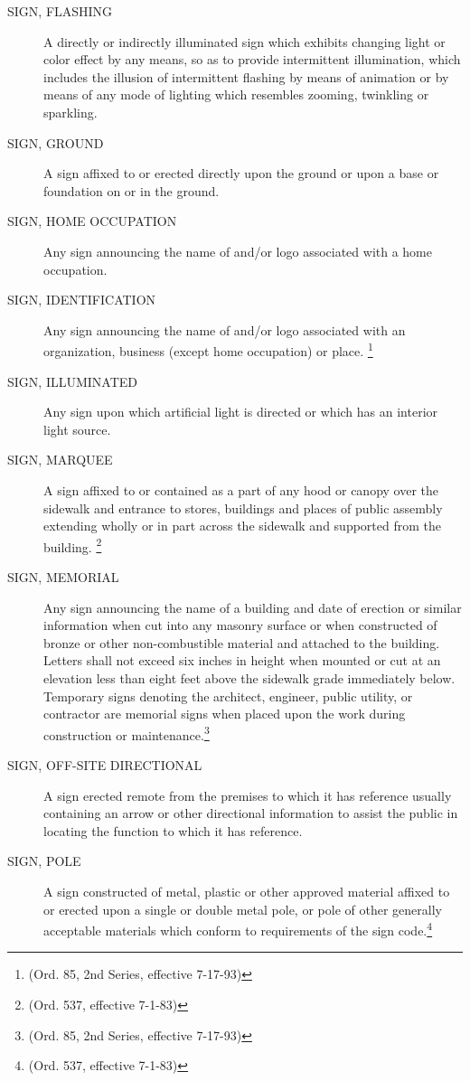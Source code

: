 \begin{description}
    \item[SIGN, FLASHING] A directly or indirectly illuminated sign which exhibits changing light or color effect by any means, so as to provide intermittent illumination, which includes the illusion of intermittent flashing by means of animation or by means of any mode of lighting which resembles zooming, twinkling or sparkling.
    \item[SIGN, GROUND] A sign affixed to or erected directly upon the ground or upon a base or foundation on or in the ground.
    \item[SIGN, HOME OCCUPATION] Any sign announcing the name of and/or logo associated with a home occupation.
    \item[SIGN, IDENTIFICATION] Any sign announcing the name of and/or logo associated with an organization, business (except home occupation) or place. \footnote{(Ord. 85, 2nd Series, effective 7-17-93)}
    \item[SIGN, ILLUMINATED] Any sign upon which artificial light is directed or which has an interior light source.
    \item[SIGN, MARQUEE] A sign affixed to or contained as a part of any hood or canopy over the sidewalk and entrance to stores, buildings and places of public assembly extending wholly or in part across the sidewalk and supported from the building. \footnote{(Ord. 537, effective 7-1-83)}
    \item[SIGN, MEMORIAL] Any sign announcing the name of a building and date of erection or similar information when cut into any masonry surface or when constructed of bronze or other non-combustible material and attached to the building.  Letters shall not exceed six inches in height when mounted or cut at an elevation less than eight feet above the sidewalk grade immediately below.  Temporary signs denoting the architect, engineer, public utility, or contractor are memorial signs when placed upon the work during construction or maintenance.\footnote{(Ord. 85, 2nd Series, effective 7-17-93)}
    \item[SIGN, OFF-SITE DIRECTIONAL] A sign erected remote from the premises to which it has reference usually containing an arrow or other directional information to assist the public in locating the function to which it has reference.
    \item[SIGN, POLE] A sign constructed of metal, plastic or other approved material affixed to or erected upon a single or double metal pole, or pole of other generally acceptable materials which conform to requirements of the sign code.\footnote{(Ord. 537, effective 7-1-83)}

\end{description}
